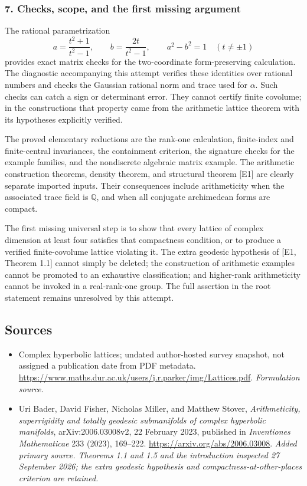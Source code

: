 \documentclass[11pt]{article}
\begin{document}
\subsubsection{7. Checks, scope, and the first missing argument}
The rational parametrization
\[
 a=\frac{t^2+1}{t^2-1},\qquad b=\frac{2t}{t^2-1},\qquad
 a^2-b^2=1\quad(t\ne\pm1)
 \tag{351.7}
\]
provides exact matrix checks for the two-coordinate form-preserving calculation. The diagnostic accompanying this attempt verifies these identities over rational numbers and checks the Gaussian rational norm and trace used for $\alpha$. Such checks can catch a sign or determinant error. They cannot certify finite covolume; in the constructions that property came from the arithmetic lattice theorem with its hypotheses explicitly verified.

The proved elementary reductions are the rank-one calculation, finite-index and finite-central invariances, the containment criterion, the signature checks for the example families, and the nondiscrete algebraic matrix example. The arithmetic construction theorems, density theorem, and structural theorem [E1] are clearly separate imported inputs. Their consequences include arithmeticity when the associated trace field is $\mathbb Q$, and when all conjugate archimedean forms are compact.

The first missing universal step is to show that every lattice of complex dimension at least four satisfies that compactness condition, or to produce a verified finite-covolume lattice violating it. The extra geodesic hypothesis of [E1, Theorem 1.1] cannot simply be deleted; the construction of arithmetic examples cannot be promoted to an exhaustive classification; and higher-rank arithmeticity cannot be invoked in a real-rank-one group. The full assertion in the root statement remains unresolved by this attempt.

\subsection{Sources}
\begin{itemize}
\item[S1]Complex hyperbolic lattices; undated author-hosted survey snapshot, not assigned a publication date from PDF metadata.
\url{https://www.maths.dur.ac.uk/users/j.r.parker/img/Lattices.pdf}.
\textit{Formulation source.}
\item[E1]Uri Bader, David Fisher, Nicholas Miller, and Matthew Stover, \emph{Arithmeticity, superrigidity and totally geodesic submanifolds of complex hyperbolic manifolds}, arXiv:2006.03008v2, 22 February 2023, published in \emph{Inventiones Mathematicae} 233 (2023), 169--222.
\url{https://arxiv.org/abs/2006.03008}.
\textit{Added primary source. Theorems 1.1 and 1.5 and the introduction inspected 27 September 2026; the extra geodesic hypothesis and compactness-at-other-places criterion are retained.}
\end{itemize}
\end{document}
